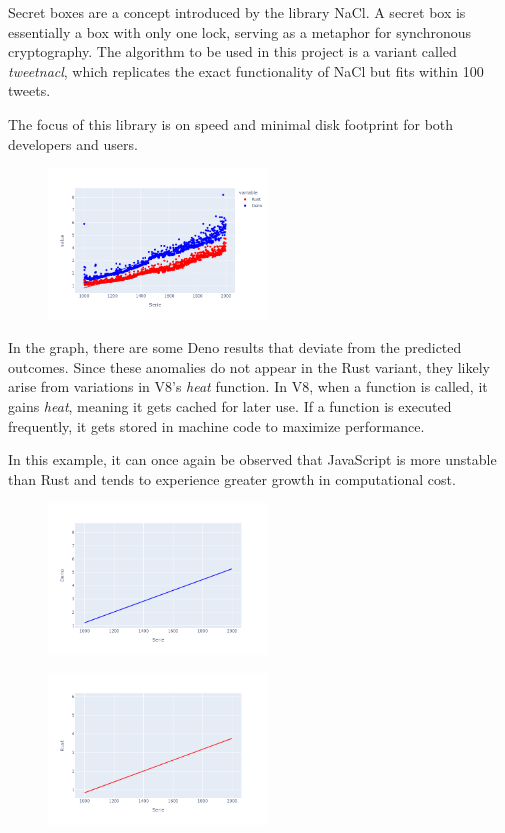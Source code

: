 \documentclass[10pt,journal,compsoc]{IEEEtran}
\begin{document}
Secret boxes are a concept introduced by the library NaCl. A secret box is essentially a box with only one lock, serving as a metaphor for synchronous cryptography. The algorithm to be used in this project is a variant called \textit{tweetnacl}, which replicates the exact functionality of NaCl but fits within 100 tweets.

The focus of this library is on speed and minimal disk footprint for both developers and users.

\begin{figure}[H]
    \centering
    \includegraphics[width=0.52\textwidth]{images/secretbox_lines}
\end{figure}

In the graph, there are some Deno results that deviate from the predicted outcomes. Since these anomalies do not appear in the Rust variant, they likely arise from variations in V8's \textit{heat} function. In V8, when a function is called, it gains \textit{heat}, meaning it gets cached for later use. If a function is executed frequently, it gets stored in machine code to maximize performance.

In this example, it can once again be observed that JavaScript is more unstable than Rust and tends to experience greater growth in computational cost.

\begin{figure}[H]
    \centering
    \includegraphics[width=0.52\textwidth]{trend_secretbox_deno}
\end{figure}

\begin{figure}[H]
    \centering
    \includegraphics[width=0.52\textwidth]{images/trend_secretbox_rust}
\end{figure}
\end{document}
